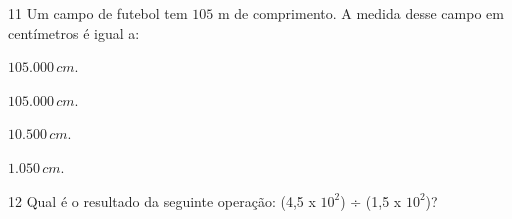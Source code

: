 

\num{11} Um campo de futebol tem $105$ m de comprimento. A medida desse campo em centímetros é igual a:

\begin{escolha}
\item $105.000\,cm$.
\item $105.000\,cm$.
\item $10.500\,cm$.
\item $1.050\,cm$.
\end{escolha}



\num{12} Qual é o resultado da seguinte operação: (4,5 x $10^2$) ÷ (1,5 x $10^2$)?

